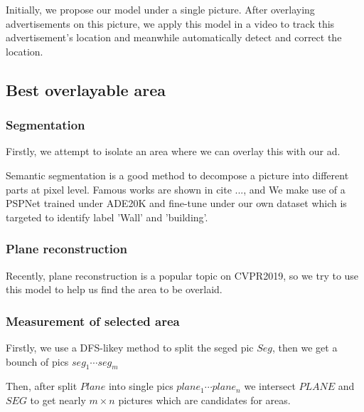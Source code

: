 \documentclass{sig-alternate}
\begin{document}
Initially, we propose our model under a single picture. 
After overlaying advertisements on this picture, we apply this model in a video to track this advertisement's location and  meanwhile automatically detect and correct the location.

\subsection{Best overlayable area}

\subsubsection{Segmentation}
Firstly, we attempt to isolate an area where we can overlay this with our ad.

Semantic segmentation is a good method to decompose a picture into different parts at pixel level. Famous works are shown in cite ..., and We make use of a PSPNet trained under ADE20K and fine-tune under our own dataset which is targeted to identify label 'Wall' and 'building'.


\subsubsection{Plane reconstruction}

Recently, plane reconstruction is a popular topic on CVPR2019, so we try to use this model to help us find the area to be overlaid.

\subsubsection{Measurement of selected area}

Firstly, we use a DFS-likey method to split the seged pic $Seg$, then we get a bounch of pics $seg_1 \cdots seg_m$


Then, after split $Plane$ into single pics $plane_1 \cdots plane_n$ we intersect $PLANE$ and $SEG$ to get nearly $m \times n$ pictures which are candidates for areas.

\end{document}
